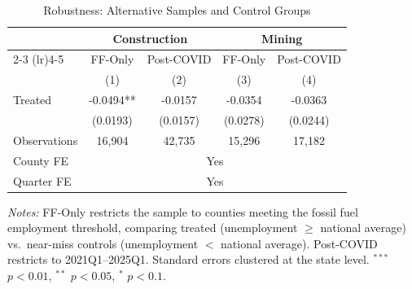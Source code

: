 \begin{table}[htbp]
\centering
\begin{threeparttable}
\caption{Robustness: Alternative Samples and Control Groups}
\label{tab:robustness}
\begin{tabular}{lcccc}
\toprule
 & \multicolumn{2}{c}{Construction} & \multicolumn{2}{c}{Mining} \\
\cmidrule(lr){2-3} \cmidrule(lr){4-5}
 & FF-Only & Post-COVID & FF-Only & Post-COVID \\
 & (1) & (2) & (3) & (4) \\
\midrule
Treated & -0.0494** & -0.0157 & -0.0354 & -0.0363 \\
 & (0.0193) & (0.0157) & (0.0278) & (0.0244) \\
\addlinespace
\midrule
Observations & 16,904 & 42,735 & 15,296 & 17,182 \\
County FE & \multicolumn{4}{c}{Yes} \\
Quarter FE & \multicolumn{4}{c}{Yes} \\
\bottomrule
\end{tabular}
\begin{tablenotes}[flushleft]\small
\item \textit{Notes:} FF-Only restricts the sample to counties meeting the fossil fuel employment threshold, comparing treated (unemployment $\geq$ national average) vs.~near-miss controls (unemployment $<$ national average). Post-COVID restricts to 2021Q1--2025Q1. Standard errors clustered at the state level. $^{***}$ $p<0.01$, $^{**}$ $p<0.05$, $^{*}$ $p<0.1$.
\end{tablenotes}
\end{threeparttable}
\end{table}
